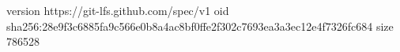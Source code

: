 version https://git-lfs.github.com/spec/v1
oid sha256:28e9f3c6885fa9c566e0b8a4ac8bf0ffe2f302c7693ea3a3ec12e4f7326fc684
size 786528
